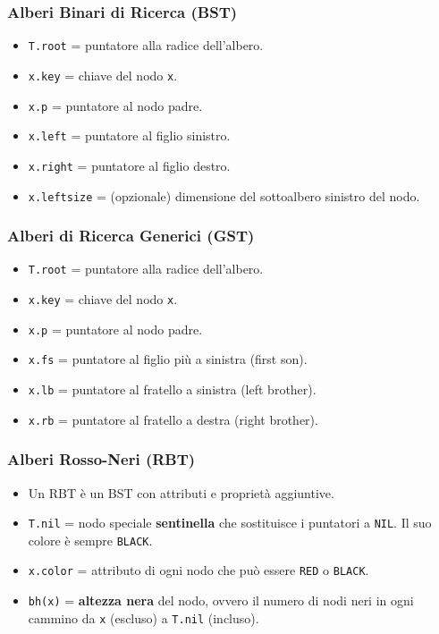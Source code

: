 \subsubsection{Alberi Binari di Ricerca (BST)}
\begin{itemize}
    \item \texttt{T.root} = puntatore alla radice dell'albero.
    \item \texttt{x.key} = chiave del nodo \texttt{x}.
    \item \texttt{x.p} = puntatore al nodo padre.
    \item \texttt{x.left} = puntatore al figlio sinistro.
    \item \texttt{x.right} = puntatore al figlio destro.
    \item \texttt{x.leftsize} = (opzionale) dimensione del sottoalbero sinistro del nodo.
\end{itemize}


\subsubsection{Alberi di Ricerca Generici (GST)}
\begin{itemize}
    \item \texttt{T.root} = puntatore alla radice dell'albero.
    \item \texttt{x.key} = chiave del nodo \texttt{x}.
    \item \texttt{x.p} = puntatore al nodo padre.
    \item \texttt{x.fs} = puntatore al figlio più a sinistra (first son).
    \item \texttt{x.lb} = puntatore al fratello a sinistra (left brother).
    \item \texttt{x.rb} = puntatore al fratello a destra (right brother).
\end{itemize}

\subsubsection{Alberi Rosso-Neri (RBT)}
\begin{itemize}
    \item Un RBT è un BST con attributi e proprietà aggiuntive.
    \item \texttt{T.nil} = nodo speciale \textbf{sentinella} che sostituisce i puntatori a \texttt{NIL}. Il suo colore è sempre \texttt{BLACK}.
    \item \texttt{x.color} = attributo di ogni nodo che può essere \texttt{RED} o \texttt{BLACK}.
    \item \texttt{bh(x)} = \textbf{altezza nera} del nodo, ovvero il numero di nodi neri in ogni cammino da \texttt{x} (escluso) a \texttt{T.nil} (incluso).
\end{itemize}

